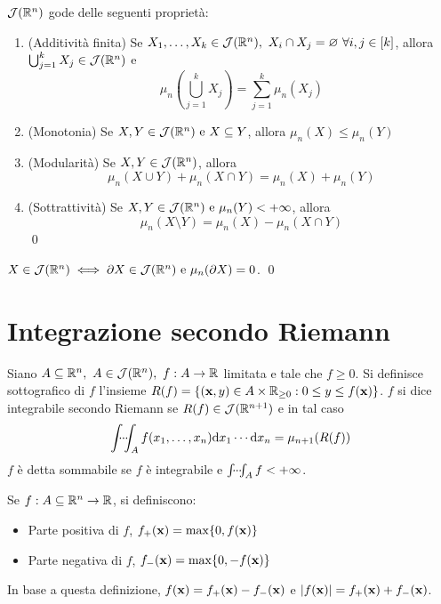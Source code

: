 \begin{theorem}
    [Proprietà di $\J(\R^n)$]
    $\J(\R^n)$ gode delle seguenti proprietà:
    \begin{enumerate}
        \item (Additività finita) Se $X_1,\dots,X_k \in \mathcal{J}(\mathbb{R}^n), \ X_i \cap X_j = \varnothing \ \forall i, j \in [k]$, allora $\bigcup_{j=1}^kX_j \in \mathcal{J}(\mathbb{R}^n)$ e
        $$
            \mu_n\left(\bigcup_{j=1}^kX_j\right) = \sum_{j=1}^k\mu_n(X_j)
        $$
        \item (Monotonia) Se $X, Y \in \mathcal{J}(\mathbb{R}^n) \text{ e } X \subseteq Y$, allora $\mu_n(X) \leq \mu_n(Y)$
        \item (Modularità) Se $X, Y \in \mathcal{J}(\mathbb{R}^n)$, allora
        $$
            \mu_n(X \cup Y) + \mu_n (X \cap Y) = \mu_n(X) + \mu_n(Y)
        $$
        \item (Sottrattività) Se $X, Y \in \mathcal{J}(\mathbb{R}^n) \text{ e } \mu_n(Y) < + \infty$, allora
        $$
            \mu_n(X \setminus Y) = \mu_n(X) - \mu_n(X \cap Y)
        $$
        \qed
    \end{enumerate}
\end{theorem}

\begin{lemma}
    $X \in \mathcal{J}(\mathbb{R}^n) \iff \partial X \in \mathcal{J}(\mathbb{R}^n) \text{ e } \mu_n(\partial X)=0$.
    \qed
\end{lemma}

\section{Integrazione secondo Riemann}

\begin{definition}
    Siano $A \subseteq \mathbb{R}^n, \ A \in \mathcal{J}(\mathbb{R}^n), \ f: A \to \mathbb{R}$ limitata e tale che $f \geq 0$. Si definisce sottografico di $f$ l'insieme $R(f)=\{(\vb{x}, y)\in A \times \mathbb{R}_{\geq 0} : 0 \leq y \leq f(\vb{x})\}$.
    $f$ si dice integrabile secondo Riemann se $R(f) \in \mathcal{J}(\mathbb{R}^{n+1})$ e in tal caso
    $$
        \idotsint_A f(x_1,\dots,x_n)\dd x_1\cdots \dd x_n=\mu_{n+1}(R(f))
    $$
    $f$ è detta sommabile se $f$ è integrabile e $\idotsint_Af < +\infty$.
\end{definition}

\begin{definition}
    \label{def:ppos_pneg}
    Se $f:A \subseteq \mathbb{R}^n \to \mathbb{R}$, si definiscono:
    \begin{itemize}
        \item Parte positiva di $f$, $f_+(\vb{x})=\max\{0,f(\vb{x})\}$
        \item Parte negativa di $f$, $f_-(\vb{x})=\max\{0,-f(\vb{x})\}$
    \end{itemize}
    In base a questa definizione, $f(\vb{x})=f_+(\vb{x})-f_-(\vb{x})$ e $\abs{f(\vb{x})}=f_+(\vb{x})+f_-(\vb{x})$.
\end{definition}

